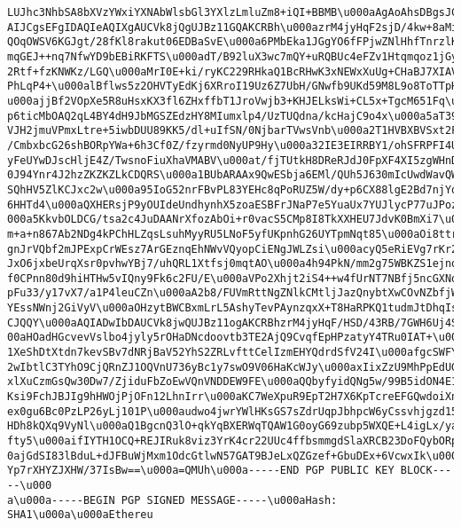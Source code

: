 \documentclass[12pt]{report}
\begin{document}
\begin{lstlisting}
LUJhc3NhbSA8bXVzYWxiYXNAbWlsbGl3YXlzLmluZm8+iQI+BBMB\u000aAgAoAhsDBgsJCAcDAgYVC
AIJCgsEFgIDAQIeAQIXgAUCVk8jQgUJBz11GQAKCRBh\u000azrM4jyHqF2sjD/4kw+8aMiSMSOxvE9
QOqOWSV6KGJgt/28fKl8rakut06EDBaSvE\u000a6PMbEka1JGgYO6fFPjwZNlHhfTnrzlKw/oP78Bh
mqGEJ++nq7NfwYD9bEBiRKFTS\u000adT/B92luX3wc7mQY+uRQBUc4eFZv1Htqmqoz1jGyVccEeZLa
2Rtf+fzKNWKz/LGQ\u000aMrI0E+ki/ryKC229RHkaQ1BcRHwK3xNEWxXuUg+CHaBJ7XIAVugx+u0vW
PhLqP4+\u000alBflws5z2OHVTyEdKj6XRroI19Uz6Z7UbH/GNwfb9UKd59M8L9o8ToTTpHQuvyvM\
u000ajjBf2VOpXe5R8uHsxKX3fl6ZHxffbT1JroVwjb3+KHJELksWi+CL5x+TgcM651Fq\u000a+Rgw
p6ticMbOAQ2qL4BY4dH9JbMGSZEdzHY8MIumxlp4/UzTUQdna/kcHajC9o4x\u000a5aT39jnWdVIeH
VJH2jmuVPmxLtre+5iwbDUU89KK5/dl+uIfSN/0NjbarTVwsVnb\u000a2T1HVBXBVSxt2FIK93IJbL
/CmbxbcG26shBORpYWa+6h3Cf0Z/fzyrmd0NyUP9Hy\u000a32IE3EIRRBY1/ohSFRPFI4U2i7t/s89
yFeUYwDJscHljE4Z/TwsnoFiuXhaVMABV\u000at/fjTUtkH8DReRJdJ0FpXF4XI5zgWHnD4rkbZeaP
0J94Ynr4J2hzZKZKZLkCDQRS\u000a1BUbARAAx9QwESbja6EMl/QUh5J630mIcUwdWavQWK2HhdNJc
SQhHV5ZlKCJxc2w\u000a95IoG52nrFBvPL83YEHc8qPoRUZ5W/dy+p6CX88lgE2Bd7njYqhys83Ovc
6HHTd4\u000aQXHERsjP9yOUIdeUndhynhX5zoaESBFrJNaP7e5YuaUx7YUJlycP77uJPozjKyA/\u
000a5KkvbOLDCG/tsa2c4JuDAANrXfozAbOi+r0vacS5CMp8I8TkXXHEU7JdvK0BmXi7\u000aSsHW+
m+a+n867Ab2NDg4kPChHLZqsLsuhMyyRU5LNoF5yfUKpnhG26UYTpmNqt85\u000aOi8ttrQflgrEWb
gnJrVQbf2mJPExpCrWEsz7ArGEznqEhNWvVQyopCiENgJWLZsi\u000acyQ5eRiEVg7rKr2M8O2VtaO
JxO6jxbeUrqXsr0pvhwYBj7/uhQRL1Xtfsj0mqtAO\u000a4h94PkN/mm2g75WBKZS1ejnoFoDiCqvq
f0CPnn80d9hiHTHw5vIQny9Fk6c2FU/E\u000aVPo2Xhjt2iS4++w4fUrNT7NBfj5ncGXNoYQE8Qky9
pFu33/y17vX7/a1P4leuCZn\u000aA2b8/FUVmRttNgZNlkCMtljJazQnybtXwCOvNZbfjW0Mh7ia5N
YEssNWnj2GiVyV\u000aOHzytBWCBxmLrL5AshyTevPAynzqxX+T8HaRPKQ1tudmJtDhqIsAEQEAAYk
CJQQY\u000aAQIADwIbDAUCVk8jwQUJBz11ogAKCRBhzrM4jyHqF/HSD/43RB/7GWH6Uj4S4oQM\u0
00aHOadHGcvevVslbo4jyly5rOHaDNcdoovtb3TE2AjQ9CvqfEpHPzatyY4TRu0IAT+\u000all4JfA
1XeShDtXtdn7kevSBv7dNRjBaV52YhS2ZRLvfttCelIzmEHYQdrdSfV24I\u000afgcSWFYjkavryFL
2wIbtlC3TYhO9CjQRnZJ1OQVnU736yBc1y7swO9V06HaKcWJy\u000axIixZzU9MhPpEdUG2i9BKVfh
xlXuCzmGsQw30Dw7/ZjiduFbZoEwVQnVNDDEW9FE\u000aQQbyfyidQNg5w/99B5idON4E1vheJRuI+
Ksi9FchJBJIg9hHWOjPjOFn12LhnIrr\u000aKC7WeXpuR9EpT2H7X6KpTcreEFGQwdoiXnM4vPwezl
ex0gu6Bc0PzLP26yLj101P\u000audwo4jwrYWlHKsGS7sZdrUqpJbhpcW6yCssvhjgzd15IN8vY8GP
HDh8kQXq9VyNl\u000aQ1BgcnQ3lO+qkYqBXERWqTQAW1G0oyG69zubp5WXQE+L4igLx/yaIBdPC3c+
fty5\u000aifIYTH1OCQ+REJIRuk8viz3YrK4cr22UUc4ffbsmmgdSlaXRCB23DoFQybORp4iU\u00
0ajGdSI83lBduL+dJFBuWjMxm1OdcGtlwN57GAT9BJeLxQZGzef+GbuDEx+6VcwxIk\u000aBpBgsW5
Yp7rXHYZJXHW/37IsBw==\u000a=QMUh\u000a-----END PGP PUBLIC KEY BLOCK-----\u000
a\u000a-----BEGIN PGP SIGNED MESSAGE-----\u000aHash: SHA1\u000a\u000aEthereu

\end{lstlisting}
\end{document}
